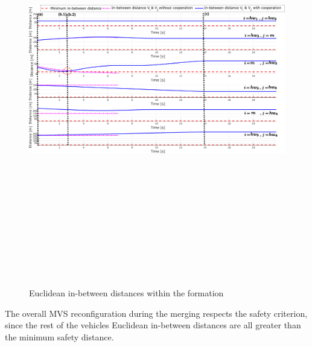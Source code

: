     \begin{figure}[!h]
        \centering 
        \includegraphics[width=13cm,height=18cm,keepaspectratio]{chapters/Chapitre_6/Figures/Scenario_1/Distances.pdf}
        \caption{Euclidean in-between distances within the formation}
        \label{fig:scenario01:formation_distances}
        \end{figure}

The overall MVS reconfiguration during the merging  respects the safety criterion, since the rest of the vehicles Euclidean in-between distances are all greater than the minimum safety distance. 







